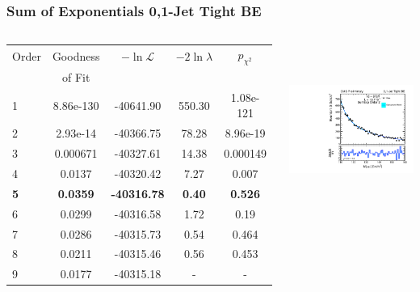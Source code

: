 \documentclass{beamer}
\begin{document}
\begin{frame}
\frametitle{Sum of Exponentials 0,1-Jet Tight BE}
  \begin{columns}[c]
   \column{60mm}
      \begin{center}
      \tiny
\begin{tabular}{|l|c|c|c|c|} \hline
Order & Goodness & $-\ln\mathcal{L}$ & $-2\ln\lambda$ & $p_{\chi^2}$ \\ 
 & of Fit  &  & &  \\ \hline \hline
1 & 8.86e-130 & -40641.90 & 550.30 & 1.08e-121  \\ \hline
2 & 2.93e-14 & -40366.75 & 78.28 & 8.96e-19  \\ \hline
3 & 0.000671 & -40327.61 & 14.38 & 0.000149  \\ \hline
4 & 0.0137 & -40320.42 & 7.27 & 0.007  \\ \hline
\bf 5 & \bf 0.0359 & \bf -40316.78 & \bf 0.40 & \bf 0.526  \\ \hline
6 & 0.0299 & -40316.58 & 1.72 & 0.19  \\ \hline
7 & 0.0286 & -40315.73 & 0.54 & 0.464  \\ \hline
8 & 0.0211 & -40315.46 & 0.56 & 0.453  \\ \hline
9 & 0.0177 & -40315.18 & - & -  \\ \hline
\end{tabular}
      \end{center}
   \column{60mm}
      \begin{center}
        \includegraphics[height=55mm]{wholeRangeHggStudy1/plotsOrderStudyExpPow/order_Shape_Jets01PassPtG10BE_SumExp2}
      \end{center}
  \end{columns}
  \begin{center}
  \end{center}
\end{frame}
\end{document}

